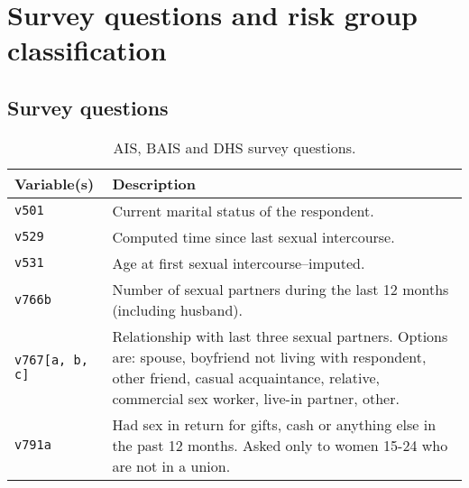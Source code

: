\documentclass[
]{article}
\begin{document}
\newpage

\hypertarget{survey-questions-and-risk-group-classification}{%
\section{Survey questions and risk group
classification}\label{survey-questions-and-risk-group-classification}}

\hypertarget{survey-questions}{%
\subsection{Survey questions}\label{survey-questions}}

\begin{footnotesize}

\begin{table}[h]
\centering
\begin{tabularx}{\textwidth}{lX}
\toprule
Variable(s) & Description \\ 
 \midrule
\texttt{v501} & Current marital status of the respondent. \\
\texttt{v529} & Computed time since last sexual intercourse. \\
\texttt{v531} & Age at first sexual intercourse--imputed. \\
\texttt{v766b} & Number of sexual partners during the last 12 months (including husband). \\
\texttt{v767[a, b, c]} & Relationship with last three sexual partners. Options are: spouse, boyfriend not living with respondent, other friend, casual acquaintance, relative, commercial sex worker, live-in partner, other. \\
\texttt{v791a} & Had sex in return for gifts, cash or anything else in the past 12 months. Asked only to women 15-24 who are not in a union. \\
\bottomrule
\end{tabularx}
\caption{AIS, BAIS and DHS survey questions.}
\end{table}

\end{footnotesize}
\end{document}
